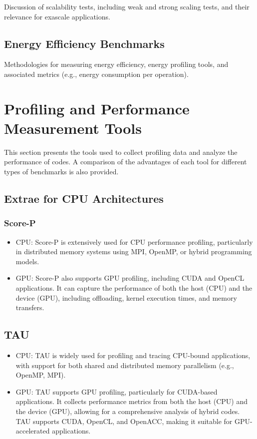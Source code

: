Discussion of scalability tests, including weak and strong scaling tests, and their relevance for exascale applications.

\subsection{Energy Efficiency Benchmarks}
\label{sec:methodology-types-energy}

Methodologies for measuring energy efficiency, energy profiling tools, and associated metrics (e.g., energy consumption per operation).

\section{Profiling and Performance Measurement Tools}
\label{sec:methodology-tools}

This section presents the tools used to collect profiling data and analyze the performance of codes. 
A comparison of the advantages of each tool for different types of benchmarks is also provided.

\subsection{Extrae for CPU Architectures}
\label{sec:methodology-tools-extrae}

\subsubsection{Score-P}
\label{sec:methodology-tools-scorep}

\begin{itemize}
    \item CPU: Score-P is extensively used for CPU performance profiling, particularly in distributed memory systems using MPI, OpenMP, or hybrid programming models.
    \item GPU: Score-P also supports GPU profiling, including CUDA and OpenCL applications. It can capture the performance of both the host (CPU) and the device (GPU), including offloading, kernel execution times, and memory transfers.
\end{itemize}


\subsection{TAU}
\label{sec:methodology-tools-tau}

\begin{itemize}
    \item CPU: TAU is widely used for profiling and tracing CPU-bound applications, with support for both shared and distributed memory parallelism (e.g., OpenMP, MPI).
    \item GPU: TAU supports GPU profiling, particularly for CUDA-based applications. It collects performance metrics from both the host (CPU) and the device (GPU), allowing for a comprehensive analysis of hybrid codes. TAU supports CUDA, OpenCL, and OpenACC, making it suitable for GPU-accelerated applications.
\end{itemize}


